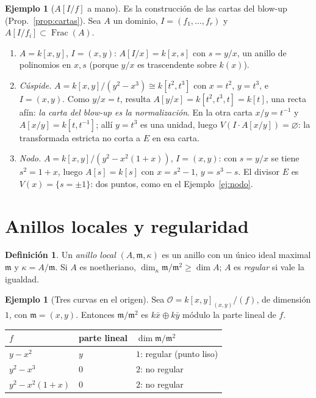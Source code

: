 \documentclass[11pt,a4paper,oneside]{book}
\newcommand{\Frac}{\operatorname{Frac}}
\newcommand{\cO}{\mathcal{O}}
\theoremstyle{plain}
\theoremstyle{definition}
\newtheorem{definicion}[teorema]{Definición}
\newtheorem{ejemplo}[teorema]{Ejemplo}
\theoremstyle{remark}
\begin{document}
\begin{ejemplo}[{$A[I/f]$ a mano}]\label{ej:AIf}
Es la construcción de las cartas del blow-up (Prop.~\ref{prop:cartas}). Sea $A$ un dominio, $I=(f_1,\dots,f_r)$ y $A[I/f_i]\subset\Frac(A)$.
\begin{enumerate}[label=(\alph*)]
\item $A=k[x,y]$, $I=(x,y)$: $A[I/x]=k[x,s]$ con $s=y/x$, un anillo de polinomios en $x,s$ (porque $y/x$ es trascendente sobre $k(x)$).
\item \emph{Cúspide.} $A=k[x,y]/(y^2-x^3)\cong k[t^2,t^3]$ con $x=t^2$, $y=t^3$, e $I=(x,y)$. Como $y/x=t$, resulta $A[y/x]=k[t^2,t^3,t]=k[t]$, una recta afín: \emph{la carta del blow-up es la normalización}. En la otra carta $x/y=t^{-1}$ y $A[x/y]=k[t,t^{-1}]$; allí $y=t^3$ es una unidad, luego $V(I\cdot A[x/y])=\varnothing$: la transformada estricta no corta a $E$ en esa carta.
\item \emph{Nodo.} $A=k[x,y]/(y^2-x^2(1+x))$, $I=(x,y)$: con $s=y/x$ se tiene $s^2=1+x$, luego $A[s]=k[s]$ con $x=s^2-1$, $y=s^3-s$. El divisor $E$ es $V(x)=\{s=\pm1\}$: dos puntos, como en el Ejemplo~\ref{ej:nodo}.
\end{enumerate}
\end{ejemplo}

\section{Anillos locales y regularidad}

\begin{definicion}
Un \emph{anillo local} $(A,\mathfrak m,\kappa)$ es un anillo con un único ideal maximal $\mathfrak m$ y $\kappa=A/\mathfrak m$. Si $A$ es noetheriano, $\dim_\kappa\mathfrak m/\mathfrak m^2\ge\dim A$; $A$ es \emph{regular} si vale la igualdad.
\end{definicion}

\begin{ejemplo}[Tres curvas en el origen]\label{ej:regular}
Sea $\cO=k[x,y]_{(x,y)}/(f)$, de dimensión $1$, con $\mathfrak m=(x,y)$. Entonces $\mathfrak m/\mathfrak m^2$ es $k\bar x\oplus k\bar y$ módulo la parte lineal de $f$.
\begin{center}
\begin{tabular}{@{}lll@{}}
\toprule
$f$ & parte lineal & $\dim\mathfrak m/\mathfrak m^2$ \\
\midrule
$y-x^2$ & $y$ & $1$: regular (punto liso) \\
$y^2-x^3$ & $0$ & $2$: no regular \\
$y^2-x^2(1+x)$ & $0$ & $2$: no regular \\
\bottomrule
\end{tabular}
\end{center}
\end{ejemplo}
\end{document}
